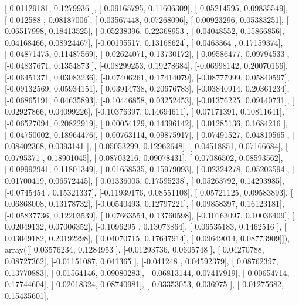 \documentclass{article}
\begin{document}
       [ 0.01129181,  0.1279936 ],
       [-0.09165795,  0.11606309],
       [-0.05214595,  0.09835549],
       [-0.012588  ,  0.08187006],
       [ 0.03567448,  0.07268096],
       [ 0.00923296,  0.05383251],
       [ 0.06517998,  0.18413525],
       [ 0.05238396,  0.22368953],
       [-0.04048552,  0.15866856],
       [ 0.04168466,  0.08924467],
       [-0.00195517,  0.13168624],
       [ 0.0463364 ,  0.17159374],
       [-0.04871475,  0.11487569],
       [ 0.02624071,  0.13730172],
       [ 0.09586477,  0.09794533],
       [-0.04837671,  0.1354873 ],
       [-0.08299253,  0.19278684],
       [-0.06998142,  0.20070166],
       [-0.06451371,  0.03083236],
       [-0.07406261,  0.17414079],
       [-0.08777999,  0.05840597],
       [-0.09132569,  0.05934151],
       [ 0.03914738,  0.20676783],
       [-0.03840914,  0.20361234],
       [-0.06865191,  0.04635893],
       [-0.10446858,  0.03252453],
       [-0.01376225,  0.09140731],
       [ 0.02927866,  0.04099226],
       [-0.10376397,  0.14694611],
       [ 0.07171391,  0.10811641],
       [-0.06527094,  0.20822919],
       [ 0.00054129,  0.14396142],
       [ 0.01285136,  0.1684216 ],
       [-0.04750002,  0.18964476],
       [-0.00763114,  0.09875917],
       [ 0.07491527,  0.04810565],
       [ 0.08402368,  0.0393141 ],
       [-0.05053299,  0.12962648],
       [-0.04518851,  0.07166684],
       [ 0.0795371 ,  0.18901045],
       [ 0.08703216,  0.09078431],
       [-0.07086502,  0.08593562],
       [-0.09992941,  0.11801349],
       [-0.01658535,  0.15979093],
       [ 0.02324278,  0.05203594],
       [ 0.01700419,  0.06572445],
       [ 0.01336005,  0.17595238],
       [ 0.05263792,  0.14293985],
       [-0.0745454 ,  0.15321337],
       [-0.11939176,  0.08551108],
       [ 0.05721125,  0.09583893],
       [ 0.06868008,  0.13178732],
       [-0.00540493,  0.12797221],
       [ 0.09858397,  0.16123181],
       [-0.05837736,  0.12203539],
       [ 0.07663554,  0.13760598],
       [-0.10163097,  0.10036409],
       [ 0.02049132,  0.07006352],
       [-0.1096295 ,  0.13073864],
       [ 0.06535183,  0.1462516 ],
       [ 0.03049182,  0.20192298],
       [ 0.04070715,  0.17647914],
       [ 0.09649014,  0.08773909]]), array([[ 0.03576234,  0.1284953 ],
       [-0.01293736,  0.0605748 ],
       [ 0.04270788,  0.08727362],
       [-0.01151087,  0.041365  ],
       [-0.041248  ,  0.04592379],
       [ 0.08762397,  0.13770883],
       [-0.01564146,  0.09080283],
       [ 0.06813144,  0.07417919],
       [-0.00654714,  0.17744604],
       [ 0.02018324,  0.08740981],
       [-0.03353053,  0.036975  ],
       [ 0.01275682,  0.15435601],
\end{document}
